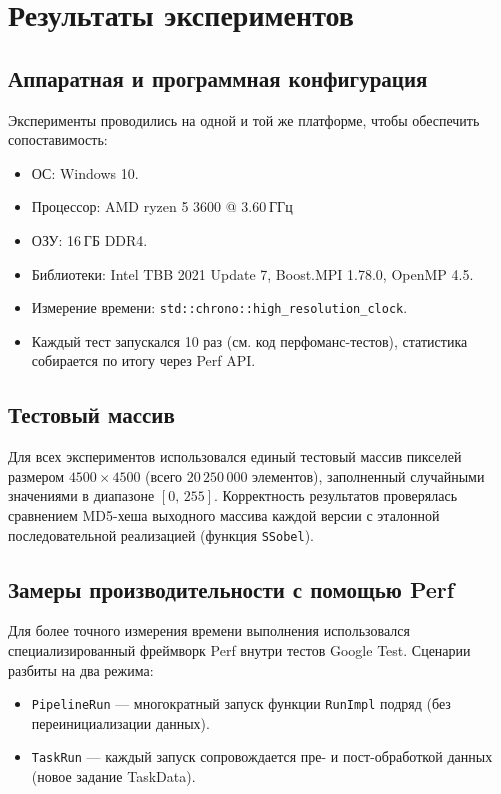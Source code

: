 \documentclass[12pt]{article}
\begin{document}
\section{Результаты экспериментов}

\subsection{Аппаратная и программная конфигурация}

Эксперименты проводились на одной и той же платформе, чтобы обеспечить сопоставимость:
\begin{itemize}
    \item ОС: Windows 10.
    \item Процессор: AMD ryzen 5 3600 @ 3.60 ГГц 
    \item ОЗУ: 16 ГБ DDR4.
    \item Библиотеки: Intel TBB 2021 Update 7, Boost.MPI 1.78.0, OpenMP 4.5.
    \item Измерение времени: \texttt{std::chrono::high\_resolution\_clock}.
    \item Каждый тест запускался 10 раз (см. код перфоманс-тестов), статистика собирается по итогу через Perf API.
\end{itemize}

\subsection{Тестовый массив}

Для всех экспериментов использовался единый тестовый массив пикселей размером $4500 \times 4500$ (всего $20\,250\,000$ элементов), заполненный случайными значениями в диапазоне $[0,\,255]$. Корректность результатов проверялась сравнением MD5-хеша выходного массива каждой версии с эталонной последовательной реализацией (функция \texttt{SSobel}).

\subsection{Замеры производительности с помощью Perf}

Для более точного измерения времени выполнения использовался специализированный фреймворк Perf внутри тестов Google Test. Сценарии разбиты на два режима:
\begin{itemize}
    \item \texttt{PipelineRun} — многократный запуск функции \texttt{RunImpl} подряд (без переинициализации данных).
    \item \texttt{TaskRun} — каждый запуск сопровождается пре- и пост-обработкой данных (новое задание TaskData).
\end{itemize}
\end{document}
